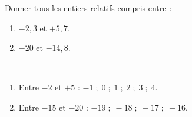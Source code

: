 \begin{exercice}
    Donner tous les entiers relatifs compris entre :
    \begin{enumerate}
       \item $-2,3$ et $+5,7$.
       \item $-20$ et $-14,8$.
    \end{enumerate}
 \end{exercice}
 
 \begin{corrige}
    \ \\ [-5mm]
    \begin{enumerate}
       \item Entre $-2$ et $+5$ : {\red$-1 \; ; \; 0 \; ; \; 1 \; ; \; 2 \; ; \; 3 \; ; \; 4$}. \smallskip
       \item Entre $-15$ et $-20$ : {\red $-19 \; ; \; -18 \; ; \; -17 \; ; \; -16$}. \smallskip
    \end{enumerate}
 \end{corrige}